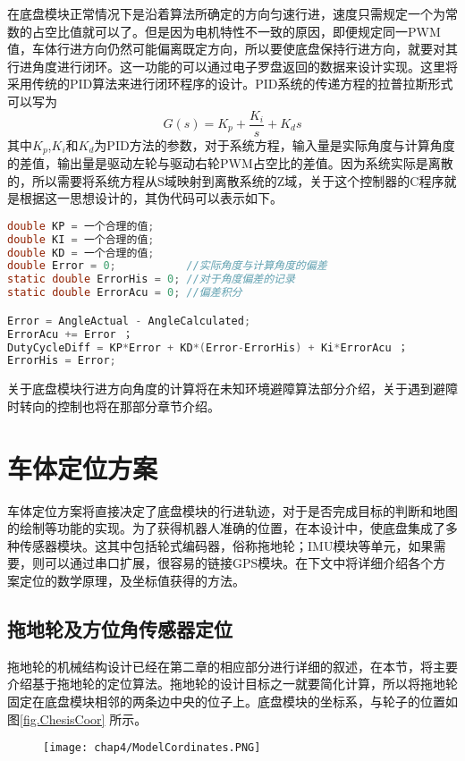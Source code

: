在底盘模块正常情况下是沿着算法所确定的方向匀速行进，速度只需规定一个为常数的占空比值就可以了。但是因为电机特性不一致的原因，即便规定同一PWM值，车体行进方向仍然可能偏离既定方向，所以要使底盘保持行进方向，就要对其行进角度进行闭环。这一功能的可以通过电子罗盘返回的数据来设计实现。这里将采用传统的PID算法来进行闭环程序的设计。PID系统的传递方程的拉普拉斯形式可以写为 \\
\begin{equation}
G(s)= K_p+\frac{K_i}{s}+K_ds
\end{equation}
其中$K_p$,$K_i$和$K_d$为PID方法的参数，对于系统方程，输入量是实际角度与计算角度的差值，输出量是驱动左轮与驱动右轮PWM占空比的差值。因为系统实际是离散的，所以需要将系统方程从S域映射到离散系统的Z域，关于这个控制器的C程序就是根据这一思想设计的，其伪代码可以表示如下。
\begin{lstlisting}[language={C}, caption={PID控制器伪代码}]
double KP = 一个合理的值;
double KI = 一个合理的值;
double KD = 一个合理的值;
double Error = 0;			//实际角度与计算角度的偏差
static double ErrorHis = 0;	//对于角度偏差的记录
static double ErrorAcu = 0;	//偏差积分

Error = AngleActual - AngleCalculated;
ErrorAcu += Error ；
DutyCycleDiff = KP*Error + KD*(Error-ErrorHis) + Ki*ErrorAcu ；
ErrorHis = Error;
\end{lstlisting}
关于底盘模块行进方向角度的计算将在未知环境避障算法部分介绍，关于遇到避障时转向的控制也将在那部分章节介绍。
\section{车体定位方案}
车体定位方案将直接决定了底盘模块的行进轨迹，对于是否完成目标的判断和地图的绘制等功能的实现。为了获得机器人准确的位置，在本设计中，使底盘集成了多种传感器模块。这其中包括轮式编码器，俗称拖地轮；IMU模块等单元，如果需要，则可以通过串口扩展，很容易的链接GPS模块。在下文中将详细介绍各个方案定位的数学原理，及坐标值获得的方法。

\subsection{拖地轮及方位角传感器定位}
拖地轮的机械结构设计已经在第二章的相应部分进行详细的叙述，在本节，将主要介绍基于拖地轮的定位算法。拖地轮的设计目标之一就要简化计算，所以将拖地轮固定在底盘模块相邻的两条边中央的位子上。底盘模块的坐标系，与轮子的位置如图\ref{fig.ChesisCoor} 所示。
\begin{figure}[!htp]
  \centering
  \texttt{[image: chap4/ModelCordinates.PNG]}
\end{figure}

